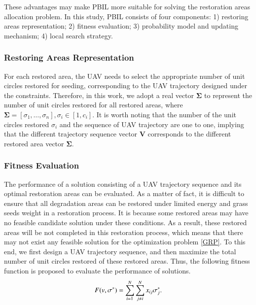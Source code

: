 \documentclass[preprint,5pt]{elsarticle}
\begin{document}
These advantages may make PBIL more suitable for solving the restoration areas allocation problem. In this study, PBIL consists of four components: 1) restoring areas representation; 2) fitness evaluation; 3) probability model and updating mechanism; 4) local search strategy.
\subsubsection{Restoring Areas Representation} For each restored area, the UAV needs to select the appropriate number of unit circles restored for seeding, corresponding to the UAV trajectory designed under the constraints. Therefore, in this work, we adopt a real vector $\mathbf{\Sigma}$ to represent the number of unit circles restored for all restored areas, where $\mathbf{\Sigma} = [\sigma_1,\ldots,\sigma_n], \sigma_i \in [1,c_i]$. It is worth noting that the number of the unit circles restored $\sigma_i$ and the sequence of UAV trajectory are one to one, implying that the different trajectory sequence vector $\mathbf{V}$ corresponds to the different restored area vector $\mathbf{\Sigma}$.
\subsubsection{Fitness Evaluation}
The performance of a solution consisting of a UAV trajectory sequence and its optimal restoration areas can be evaluated. As a matter of fact, it is difficult to ensure that all degradation areas can be restored under limited energy and grass seeds weight in a restoration process. It is because some restored areas may have no feasible candidate solution under these conditions. As a result, these restored areas will be not completed in this restoration process, which means that there may not exist any feasible solution for the optimization problem \eqref{GRP}. To this end, we first design a UAV trajectory sequence, and then maximize the total number of unit circles restored of these restored areas. Thus, the following fitness function is proposed to evaluate the performance of solutions.
\begin{equation} \label{Fitness-Evaluation}
\begin{small}
F(v,\sigma^*) = \sum^N_{i = 1}\sum^N_{j \neq i} x_{ij}\sigma^*_j.
\end{small}
\end{equation}
\end{document}

